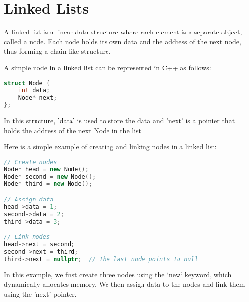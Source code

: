 \chapter{Linked Lists}

A linked list is a linear data structure where each element is a
separate object, called a node. Each node holds its own data and the
address of the next node, thus forming a chain-like structure.

A simple node in a linked list can be represented in C++ as follows:

\begin{lstlisting}[language=C++]
struct Node {
    int data;
    Node* next;
};
\end{lstlisting}

In this structure, 'data' is used to store the data and 'next' is a
pointer that holds the address of the next Node in the list.

Here is a simple example of creating and linking nodes in a linked
list:

\begin{lstlisting}[language=C++]
// Create nodes
Node* head = new Node();
Node* second = new Node();
Node* third = new Node();

// Assign data
head->data = 1;
second->data = 2;
third->data = 3;

// Link nodes
head->next = second;
second->next = third;
third->next = nullptr;  // The last node points to null
\end{lstlisting}

In this example, we first create three nodes using the `new` keyword,
which dynamically allocates memory. We then assign data to the nodes
and link them using the 'next' pointer.
